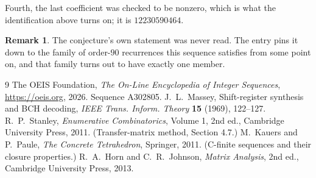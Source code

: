 \documentclass[11pt,a4paper]{article}
\theoremstyle{plain}
\theoremstyle{definition}
\newtheorem{remark}[theorem]{Remark}
\begin{document}
Fourth, the last coefficient was checked to be nonzero, which is what the identification above
turns on; it is $12230590464$.

\begin{remark}
The conjecture's own statement was never read. The entry pins it down to the family of
order-$90$ recurrences this sequence satisfies from some point on, and that family turns
out to have exactly one member.
\end{remark}

\begin{thebibliography}{9}
 The OEIS Foundation, \emph{The On-Line Encyclopedia of Integer
Sequences}, \url{https://oeis.org}, 2026. Sequence A302805.
 J.~L.~Massey, Shift-register synthesis and BCH decoding, \emph{IEEE
Trans. Inform. Theory} \textbf{15} (1969), 122--127.
 R.~P.~Stanley, \emph{Enumerative Combinatorics}, Volume 1, 2nd ed.,
Cambridge University Press, 2011. (Transfer-matrix method, Section 4.7.)
 M.~Kauers and P.~Paule, \emph{The Concrete Tetrahedron}, Springer, 2011.
(C-finite sequences and their closure properties.)
 R.~A.~Horn and C.~R.~Johnson, \emph{Matrix Analysis}, 2nd ed., Cambridge
University Press, 2013.
\end{thebibliography}
\end{document}
